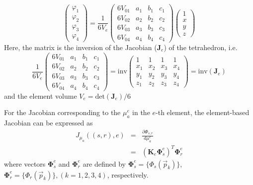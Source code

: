 \documentclass[12pt]{book}               %
\begin{document}
\begin{equation}
\left(
\begin{array}{l}
\varphi_1\\
\varphi_2\\
\varphi_3\\
\varphi_4
\end{array}\right)=\frac{1}{6V_e}\left(
\begin{array}{llll}
6V_{01} & a_1 & b_1 & c_1 \\
6V_{02} & a_2 & b_2 & c_2 \\
6V_{03} & a_3 & b_3 & c_3 \\
6V_{04} & a_4 & b_4 & c_4 
\end{array}
\right)\left(
\begin{array}{l}
1\\
x\\
y\\
z
\end{array}\right)
\end{equation}
Here, the matrix is the inversion of the Jacobian ($\mathbf{J}_e$) of the tetrahedron, i.e.
\begin{equation}\frac{1}{6V_e}
\left(
\begin{array}{llll}
6V_{01} & a_1 & b_1 & c_1 \\
6V_{02} & a_2 & b_2 & c_2 \\
6V_{03} & a_3 & b_3 & c_3 \\
6V_{04} & a_4 & b_4 & c_4 
\end{array}
\right)=\textrm{inv}\left(
\begin{array}{llll}
1 & 1 & 1 & 1 \\
x_1 & x_2 & x_3 & x_4 \\
y_1 & y_2 & y_3 & y_4 \\
z_1 & z_2 & z_3 & z_4  
\end{array}
\right)=\textrm{inv}(\mathbf{J}_e)
\end{equation}
and the element volume $V_e=\textrm{det}(\mathbf{J}_e)/6$

For the Jacobian corresponding to the $\mu_a^e$ in the $e$-th element, the 
element-based Jacobian can be expressed as
\begin{eqnarray}\nonumber
J_{\mu_a}((s,r),e)&=&\frac{\partial
\Phi_{s,r}}{d\mu_a^{e}}\\&=&\left(\mathbf{K}_e{\boldsymbol\Phi}_s^e\right)^T{\boldsymbol\Phi}_r^e
\end{eqnarray}
where vectors $\boldsymbol{\Phi}_s^e$ and $\boldsymbol{\Phi}_r^e$
are defined by $\boldsymbol{\Phi}_s^e=\{\Phi_s(\vec{p}_k)\}$,
$\boldsymbol{\Phi}_r^e=\{\Phi_r(\vec{p}_k)\}, (k=1,2,3,4)$,
respectively.
\end{document}
